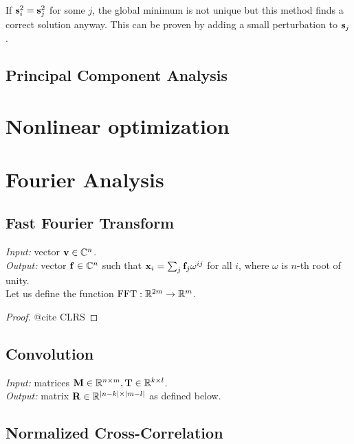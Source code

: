 If $\mathbf{s}_i^2 = \mathbf{s}_j^2$ for some $j$, the global minimum is not unique but this method finds a correct solution anyway.
This can be proven by adding a small perturbation to $\mathbf{s}_j$.

\subsection{Principal Component Analysis}

\section{Nonlinear optimization}



\section{Fourier Analysis}

\subsection{Fast Fourier Transform}
\textit{Input:} vector $\mathbf{v} \in \mathbb{C}^n$.\\
\textit{Output:} vector $\mathbf{f} \in \mathbb{C}^n$ such that $\mathbf{x}_i = \sum_j \mathbf{f}_j \omega^{i j}$ for all $i$, where $\omega$ is $n$-th root of unity.\\

Let us define the function $\mathrm{FFT}: \mathbb{R}^{2m} \rightarrow \mathbb{R}^m$.

\begin{proof}
@cite CLRS
\end{proof}

\subsection{Convolution}

\textit{Input:} matrices $\mathbf{M} \in \mathbb{R}^{n \times m}, \mathbf{T} \in \mathbb{R}^{k \times l}$.\\
\textit{Output:} matrix $\mathbf{R} \in \mathbb{R}^{|n-k| \times |m - l|}$ as defined below.\\

\subsection{Normalized Cross-Correlation}

